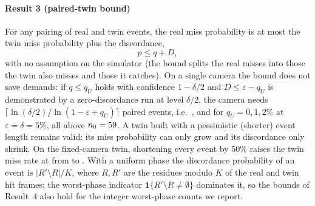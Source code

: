\paragraph{Result 3 (paired-twin bound)}\label{res:c3} For any pairing of real and twin events, the real miss
probability is at most the twin miss probability plus the discordance,
\[p\le q+D,\]
with no assumption on the simulator (the bound splits the real misses into those the twin also misses and those it
catches). On a single camera the bound does not save demands: if $q\le q_U$ holds with confidence $1-\delta/2$ and $D\le\varepsilon-q_U$ is
demonstrated by a zero-discordance run at level $\delta/2$, the camera needs
$\lceil\ln(\delta/2)/\ln(1-\varepsilon+q_U)\rceil$ paired events, i.e.\ \nCthreeA, \nCthreeB{} and \nCthreeC{} for
$q_U=0,1,2\%$ at $\varepsilon=\delta=5\%$, all above $n_0=59$. A twin built with a pessimistic (shorter) event length
remains valid: its miss probability can only grow and its discordance only shrink. On the fixed-camera twin, shortening
every event by 50\% raises the twin miss rate at \OPs{} from \nCfiveQzero{} to \nCfiveQfifty. With a uniform phase the
discordance probability of an event is $|R'\setminus R|/K$, where $R,R'$ are the residues modulo $K$ of the real and twin
hit frames; the worst-phase indicator $\mathbf 1\{R'\setminus R\ne\emptyset\}$ dominates it, so the bounds of Result~4 also
hold for the integer worst-phase counts we report.

